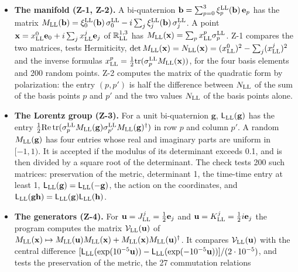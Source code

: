 \documentclass[
  10pt,
]{article}
\providecommand{\tightlist}{%
  \setlength{\itemsep}{0pt}\setlength{\parskip}{0pt}}
\begin{document}
\begin{itemize}
\tightlist
\item
  \textbf{The manifold (Z-1, Z-2).} A bi-quaternion
  \(\mathbf b=\sum_{p=0}^3\xi^{\rm LL}_p(\mathbf b)\,\mathbf e_p\) has
  the matrix
  \(M_{\rm LL}(\mathbf b)=\xi^{\rm LL}_0(\mathbf b)\,\sigma^{\rm LL}_0-i\sum_j\xi^{\rm LL}_j(\mathbf b)\,\sigma^{\rm LL}_j\).
  A point
  \(\mathbf x=x^0_{\rm LL}\mathbf e_0+i\sum_jx^j_{\rm LL}\mathbf e_j\)
  of \(\mathbb R^{1,3}_{\rm LL}\) has
  \(M_{\rm LL}(\mathbf x)=\sum_px^p_{\rm LL}\sigma^{\rm LL}_p\). Z-1
  compares the two matrices, tests Hermiticity,
  \(\det M_{\rm LL}(\mathbf x)=N_{\rm LL}(\mathbf x)=(x^0_{\rm LL})^2-\sum_j(x^j_{\rm LL})^2\)
  and the inverse formulas
  \(x^p_{\rm LL}=\tfrac12\mathrm{tr}(\sigma^{\rm LL}_pM_{\rm LL}(\mathbf x))\),
  for the four basis elements and 200 random points. Z-2 computes the
  matrix of the quadratic form by polarization: the entry \((p,p')\) is
  half the difference between \(N_{\rm LL}\) of the sum of the basis
  points \(p\) and \(p'\) and the two values \(N_{\rm LL}\) of the basis
  points alone.
\item
  \textbf{The Lorentz group (Z-3).} For a unit bi-quaternion
  \(\mathbf g\), \(\mathsf L_{\rm LL}(\mathbf g)\) has the entry
  \(\tfrac12\mathrm{Re}\,\mathrm{tr}(\sigma^{\rm LL}_pM_{\rm LL}(\mathbf g)\sigma^{\rm LL}_{p'}M_{\rm LL}(\mathbf g)^\dagger)\)
  in row \(p\) and column \(p'\). A random \(M_{\rm LL}(\mathbf g)\) has
  four entries whose real and imaginary parts are uniform in \([-1,1)\).
  It is accepted if the modulus of its determinant exceeds 0.1, and is
  then divided by a square root of the determinant. The check tests 200
  such matrices: preservation of the metric, determinant 1, the
  time-time entry at least 1,
  \(\mathsf L_{\rm LL}(\mathbf g)=\mathsf L_{\rm LL}(-\mathbf g)\), the
  action on the coordinates, and
  \(\mathsf L_{\rm LL}(\mathbf g\mathbf h)=\mathsf L_{\rm LL}(\mathbf g)\mathsf L_{\rm LL}(\mathbf h)\).
\item
  \textbf{The generators (Z-4).} For
  \(\mathbf u=J^j_{\rm LL}=\tfrac12\mathbf e_j\) and
  \(\mathbf u=K^j_{\rm LL}=\tfrac12i\mathbf e_j\) the program computes
  the matrix \(\mathcal V_{\rm LL}(\mathbf u)\) of
  \(M_{\rm LL}(\mathbf x)\mapsto M_{\rm LL}(\mathbf u)M_{\rm LL}(\mathbf x)+M_{\rm LL}(\mathbf x)M_{\rm LL}(\mathbf u)^\dagger\).
  It compares \(\mathcal V_{\rm LL}(\mathbf u)\) with the central
  difference
  \([\mathsf L_{\rm LL}(\exp(10^{-5}\mathbf u))-\mathsf L_{\rm LL}(\exp(-10^{-5}\mathbf u))]/(2\cdot10^{-5})\),
  and tests the preservation of the metric, the 27 commutation relations

\end{itemize}
\end{document}
